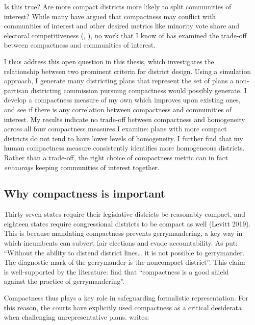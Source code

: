 \documentclass[]{article}
\begin{document}
Is this true? Are more compact districts more likely to split
communities of interest? While many have argued that compactness may
conflict with communities of interest and other desired metrics like
minority vote share and electoral competitiveness (\citep{cain1984},
\cite{karlan1989}), no work that I know of has examined the trade-off
between compactness and communities of interest.

I thus address this open question in this thesis, which investigates the
relationship between two prominent criteria for district design. Using a
simulation approach, I generate many districting plans that represent
the set of plans a non-partisan districting commission pursuing
compactness would possibly generate. I develop a compactness measure of
my own which improves upon existing ones, and see if there is any
correlation between compactness and communities of interest. My results
indicate no trade-off between compactness and homogeneity across all
four compactness measures I examine: plans with more compact districts
do not tend to have lower levels of homogeneity. I further find that my
human compactness measure consistently identifies more homogeneous
districts. Rather than a trade-off, the right choice of compactness
metric can in fact \emph{encourage} keeping communities of interest
together.

\hypertarget{why-compactness-is-important}{%
\subsection{Why compactness is
important}\label{why-compactness-is-important}}

Thirty-seven states require their legislative districts be reasonably
compact, and eighteen states require congressional districts to be
compact as well (Levitt 2019). This is because mandating compactness
prevents gerrymandering, a key way in which incumbents can subvert fair
elections and evade accountability. As \cite{pp1991} put: ``Without the
ability to distend district lines\ldots{} it is not possible to
gerrymander. The diagnostic mark of the gerrymander is the noncompact
district''. This claim is well-supported by the literature:
\cite{apollonio2006} find that ``compactness is a good shield against
the practice of gerrymandering''.

Compactness thus plays a key role in safeguarding formalistic
representation. For this reason, the courts have explicitly used
compactness as a critical desiderata when challenging unrepresentative
plans. \cite{altman1998} writes:
\end{document}
